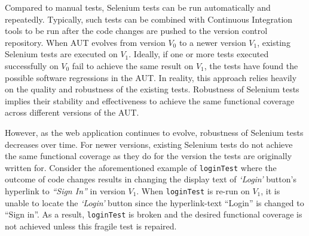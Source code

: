 
  

Compared to manual tests, Selenium tests can be run automatically and repeatedly. Typically, such tests can be combined with Continuous Integration tools to be run after the code changes are pushed to the version control repository. When AUT evolves from version $V_{0}$ to a newer version $V_{1}$, existing Selenium tests are executed on $V_{1}$. Ideally, if one or more tests executed successfully on $V_{0}$ fail to achieve the same result on $V_{1}$, the tests have found the possible software regressions in the AUT. In reality, this approach relies heavily on the quality and robustness of the existing tests. Robustness of Selenium tests implies their stability and effectiveness to achieve the same functional coverage across different versions of the AUT. 

However, as the web application continues to evolve, robustness of Selenium tests decreases over time. For newer versions, existing Selenium tests do not achieve the same functional coverage as they do for the version the tests are originally written for. Consider the aforementioned example of \texttt{loginTest} where the outcome of code changes results in changing the display text of \textit{`Login'} button's hyperlink to \textit{``Sign In''} in version $V_{1}$. When \texttt{loginTest} is re-run on $V_{1}$, it is unable to locate the \textit{`Login'} button since the hyperlink-text ``Login'' is changed to ``Sign in''. As a result, \texttt{loginTest} is broken and the desired functional coverage is not achieved unless this fragile test is repaired. 


